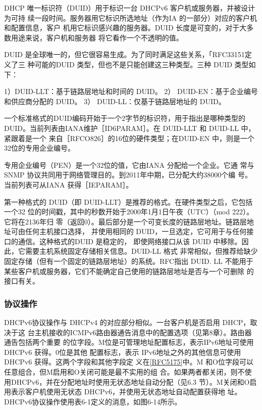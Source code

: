 DHCP 唯一标识符（DUID）用于标识一台 DHCPv6 客户机或服务器，并被设计为可持
续一段时间。服务器用它标识所选地址（作为IA 的一部分）对应的客户机和配置信息，客户
机用它标识感兴趣的服务器。DUID 长度是可变的，对于大多数用途来说，客户机和服务器
将它看作一个不透明的值。

DUID 是全球唯一的，但它很容易生成。为了同时满足这些关系，「RFC33151定义了三
种可能的DUID 类型，但也不是只能创建这三种类型。三种 DUID 类型如下：

1）DUID-LLT：基于链路层地址和时间的 DUID。
2） DUID-EN：基于企业编号和供应商分配的 DUID。
3） DUID-LL：仅基于链路层地址的 DUID。

一个标准格式的DUID编码开始于一个2字节的标识符，用于指出是哪种类型的
DUID。当前列表由IANA维护［ID6PARAM］。在 DUID-LLT 和 DUID-LL 中，紧跟着是一个
来自［RFCO826］的16位的硬件类型；在DUID-EN 中，则是一个32位的专用企业编号。

\begin{tcolorbox}
    专用企业编号（PEN）是一个32位的值，它由IANA 分配给一个企业。它通
    常与 SNMP 协议共同用于网络管理目的。到2011年中期，已分配大约38000个编
    号。当前列表可从IANA 获得［IEPARAM］。
\end{tcolorbox}

第一种格式的 DUID（即 DUID-LLT）是推荐的格式。在硬件类型之后，它包括一个32
位的时间戳，其中的秒数开始于2000年1月1日午夜（UTC）（mod 222）。它将在2136年归
零（返回0）。最后部分是一个可变长度的链路层地址。链路层地址可由任何主机接口选择，
并使用相同的 DUID，一旦选定，它可用于与任何接口的通信。这种格式的DUID 是稳定的，
即使网络接口从该 DUID 中移除。因此，它需要主机系统固定存储相关信息。DUID-LL 格式
非常相似，但推荐给缺少固定存储（但有一个固定的链路层地址）的系统。RFC指出 DUID.
LL 不能用于某些客户机或服务器，它们不能确定自己使用的链路层地址是否与一个可删除
的接口有关。

\subsubsection{协议操作}
DHCPv6协议操作与 DHCPv4 的对应部分相似。一台客户机是否启用 DHCP，取决于这
台主机接收的ICMPv6路由器通告消息中的配置选项（见第8章）。路由器通告包括两个重要
的位字段。M位是可管理地址配置标志，表示IPv6地址可使用DHCPv6 获得。0位是其他
配置标志，表示 IPv6地址之外的其他信息可使用DHCPv6 获得。这两个字段和其他字段定
义在\href{https://www.rfc-editor.org/rfc/rfc5175}{\href{https://www.rfc-editor.org/rfc/rfc5175}{[RFC5175]}}中。M 和O位字段可以任意组合，但M启用和O关闭可能是最不实用的组
合。如果两者都关闭，则不使用DHCPv6，并在分配地址时使用无状态地址自动分配（见6.3
节）。M关闭和O启用表示客户机使用无状态 DHCPv6，并使用无状态地址自动配置获得地
址。DHCPv6协议操作使用表6-1定义的消息，如图6-14所示。


